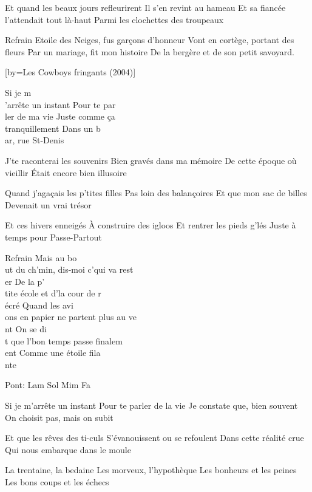 \beginverse
Et quand les beaux jours refleurirent
Il s'en revint au hameau
Et sa fiancée l'attendait tout là-haut
Parmi les clochettes des troupeaux
\endverse

\beginverse
Refrain
Etoile des Neiges, fus garçons d'honneur
Vont en cortège, portant des fleurs
Par un mariage, fit mon histoire
De la bergère et de son petit savoyard.
\endverse

[by={Les Cowboys fringants (2004)}]

\beginverse
Si je m\\[lam]'arrête un instant
Pour te par\\[Sol]ler de ma vie
Juste comme ça\\[Mim] tranquillement
Dans un b\\[Fa]ar, rue St-Denis
\endverse

\beginverse
J'te raconterai les souvenirs
Bien gravés dans ma mémoire
De cette époque où vieillir
Était encore bien illusoire
\endverse

\beginverse
Quand j'agaçais les p'tites filles
Pas loin des balançoires
Et que mon sac de billes
Devenait un vrai trésor
\endverse

\beginverse
Et ces hivers enneigés
À construire des igloos
Et rentrer les pieds g'lés
Juste à temps pour Passe-Partout
\endverse

\beginverse
Refrain
Mais au bo\\[Lam]ut du ch'min, dis-moi c'qui va rest\\[sol]er
De la p'\\[Mim]tite école et d'la cour de r\\[Fa]écré
Quand les avi\\[Lam]ons en papier ne partent plus au ve\\[Sol]nt
On se di\\[Mim]t que l'bon temps passe finalem\\[Fa]ent
Comme une étoile fila\\[lam]nte
\endverse

\beginverse
Pont: Lam Sol Mim Fa
\endverse

\beginverse
Si je m'arrête un instant
Pour te parler de la vie
Je constate que, bien souvent
On choisit pas, mais on subit
\endverse

\beginverse
Et que les rêves des ti-culs
S'évanouissent ou se refoulent
Dans cette réalité crue
Qui nous embarque dans le moule
\endverse

\beginverse
La trentaine, la bedaine
Les morveux, l'hypothèque
Les bonheurs et les peines
Les bons coups et les échecs
\endverse

